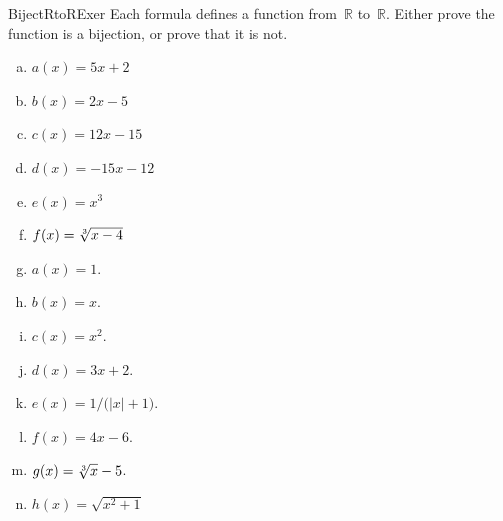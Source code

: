\begin{exercise}{BijectRtoRExer}
Each formula defines a function from~$\mathbb{R}$ to~$\mathbb{R}$.  Either prove the function is a bijection, or prove that it is not.
\begin{multicols}{2}
\begin{enumerate}[(a)]
\item \label{BijectRtoRExer-(5x+2)}
$a(x) = 5x+2$
\item \label{BijectRtoRExer-(2x-5)}
$b(x) = 2x - 5$
\item \label{BijectRtoRExer-(12x-15)}
 $c(x) = 12x-15$
\item \label{BijectRtoRExer-(-15x-12)}
$d(x) = -15x - 12$
\item \label{BijectRtoRExer-(x^3)}
$e(x) = x^3$
\item \label{BijectRtoRExer-(root3of(x-4))}
$f(x) = \root 3 \of {x-4} $
\item \label{WhichBijRExer-(1)}
$a(x) = 1$.
\item \label{WhichBijRExer-(x)}
$b(x) = x$.
\item \label{WhichBijRExer-(x^2)}
$c(x) = x^2$.
\item \label{WhichBijRExer-(3x+2)}
$d(x) = 3x + 2$.
\item \label{WhichBijRExer-(1/(|x|+1))}
$e(x) = 1/ \bigl( |x| + 1 \bigr)$.
\item \label{WhichBijRExer-(4x-6)}
$f(x) = 4x - 6$.
\item \label{WhichBijRExer-(root3ofx-5)}
$g(x) = \root 3 \of {x} - 5$.
\item \label{WhichBijRExer-(sqrt(x^2+1))}
$h(x) = \sqrt{x^2 + 1}$
\end{enumerate}
\end{multicols}
\end{exercise}
%
%



